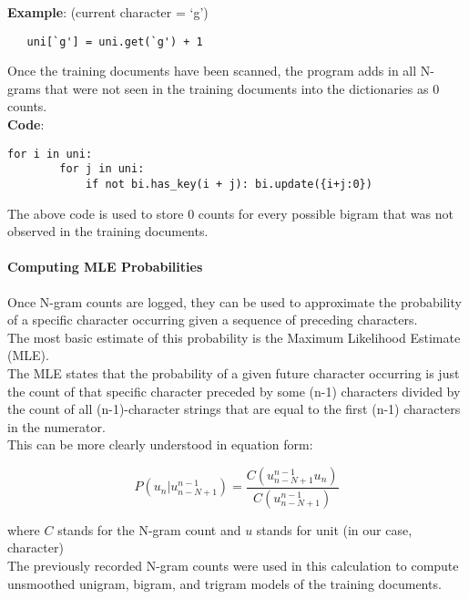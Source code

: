 \documentclass[a4,10pt]{article}
\begin{document}
\textbf{Example}:  (current character =  `g') 
\begin{verbatim}   uni[`g'] = uni.get(`g') + 1 
\end{verbatim}

\newpage

Once the training documents have been scanned, the program adds in all N-grams that were not seen in the training documents into the dictionaries as 0 counts. \\

\textbf{Code}:

\begin{verbatim}
for i in uni:
        for j in uni:
            if not bi.has_key(i + j): bi.update({i+j:0})
\end{verbatim}

The above code is used to store 0 counts for every possible bigram that was not observed in the training documents. 

\paragraph{Computing MLE Probabilities}

Once N-gram counts are logged, they can be used to approximate the probability of a specific character occurring given a sequence of preceding characters. \\

The most basic estimate of this probability is the Maximum Likelihood Estimate (MLE). \\

The MLE states that the probability of a given future character occurring is just the count of that specific character preceded by some (n-1) characters divided by the count of all (n-1)-character strings that are equal to the first (n-1) characters in the numerator. \\

This can be more clearly understood in equation form: 

\begin{equation} P(u_n | u^{n-1}_{n-N+1}) = \frac{C(u^{n-1}_{n-N+1}u_n)}{C(u^{n-1}_{n-N+1})} \end{equation}

where $C$ stands for the N-gram count and $u$ stands for unit (in our case, character) \\

The previously recorded N-gram counts were used in this calculation to compute unsmoothed unigram, bigram, and trigram models of the training documents. 
\end{document}
